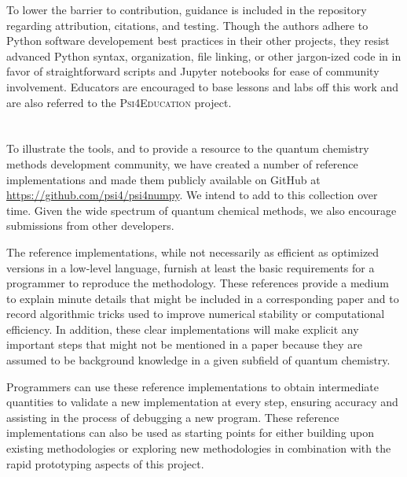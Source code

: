 To lower the barrier to contribution, guidance is included in the repository regarding attribution, citations, and testing. Though the authors adhere to Python software developement best practices in their other projects, they resist advanced Python syntax, organization, file linking, or other jargon-ized code in \pfn in favor of straightforward scripts and Jupyter notebooks for ease of community involvement.  Educators are encouraged to base lessons and labs off this work and are also referred to the \textsc{Psi4Education} project\cite{psi4edu}.


\section{}

To illustrate the \pfn tools, and to provide a resource to the quantum chemistry methods development community, we have created a number of reference implementations and made them publicly available on GitHub at \url{https://github.com/psi4/psi4numpy}.  We intend to add to this collection over time.  Given the wide spectrum of quantum chemical methods, we also encourage submissions from other developers.

The \pfn reference implementations, while not necessarily as efficient as optimized versions in a low-level language, furnish at least the basic requirements for a programmer to reproduce the methodology. These references provide a medium to explain minute details that might be included in a corresponding paper and to record algorithmic tricks used to improve numerical stability or computational efficiency. In addition, these clear implementations will make explicit any important steps that might not be mentioned in a paper because they are assumed to be background knowledge in a given subfield of quantum chemistry.

Programmers can use these reference implementations to obtain intermediate quantities to validate a new implementation at every step, ensuring accuracy and assisting in the process of debugging a new program. These reference implementations can also be used as starting points for either building upon existing methodologies or exploring new methodologies in combination with the rapid prototyping aspects of this project.

